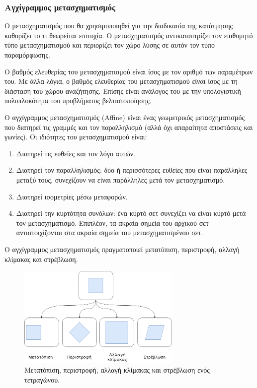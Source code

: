 \documentclass[a4paper,12pt]{article}
\begin{document}
\subsubsection{Αγχίγραμμος μετασχηματισμός} \label{reg:affine:1}

Ο μετασχηματισμός που θα χρησιμοποιηθεί για την διαδικασία της κατάτμησης
καθορίζει το τι θεωρείται επιτυχία. Ο μετασχηματισμός αντικατοπτρίζει τον
επιθυμητό τύπο μετασχηματισμού και περιορίζει τον χώρο λύσης σε αυτόν τον τύπο
παραμόρφωσης.

Ο βαθμός ελευθερίας του μετασχηματισμού είναι ίσος με τον αριθμό των παραμέτρων
του. Με άλλα λόγια, ο βαθμός ελευθερίας του μετασχηματισμού είναι ίσος με τη
διάσταση του χώρου αναζήτησης. Επίσης είναι ανάλογος του με την υπολογιστική
πολυπλοκότητα του προβλήματος βελτιστοποίησης.

Ο αγχίγραμμος μετασχηματισμός (Affine) είναι ένας γεωμετρικός μετασχηματισμός
που διατηρεί τις γραμμές και τον παραλληλισμό (αλλά όχι απαραίτητα αποστάσεις
και γωνίες). Οι ιδιότητες του μετασχηματισμού είναι:

\begin{enumerate}
    \item Διατηρεί τις ευθείες και τον λόγο αυτών.
    \item Διατηρεί τον παραλληλισμός: δύο ή περισσότερες ευθείες που είναι
        παράλληλες μεταξύ τους, συνεχίζουν να είναι παράλληλες μετά τον
        μετασχηματισμό.
    \item Διατηρεί ισομετρίες μέσω μεταφορών. 
    \item Διατηρεί την κυρτότητα συνόλων: ένα κυρτό σετ συνεχίζει να είναι κυρτό
        μετά τον μετασχηματισμό. Επιπλέον, τα ακραία σημεία του αρχικού σετ
        αντιστοιχίζονται στα ακραία σημεία του μετασχηματισμένου σετ.
\end{enumerate}

Ο αγχίγραμμος μετασχηματισμός πραγματοποιεί μετατόπιση, περιστροφή, αλλαγή
κλίμακας και στρέβλωση.

\begin{figure}[H]
    \centering
    \includegraphics[width=0.7\textwidth]{affine_2}
    \captionsetup{width=0.7\textwidth}
    \caption{Μετατόπιση, περιστροφή, αλλαγή κλίμακας και στρέβλωση ενός
    τετραγώνου.}
\end{figure}
\end{document}
